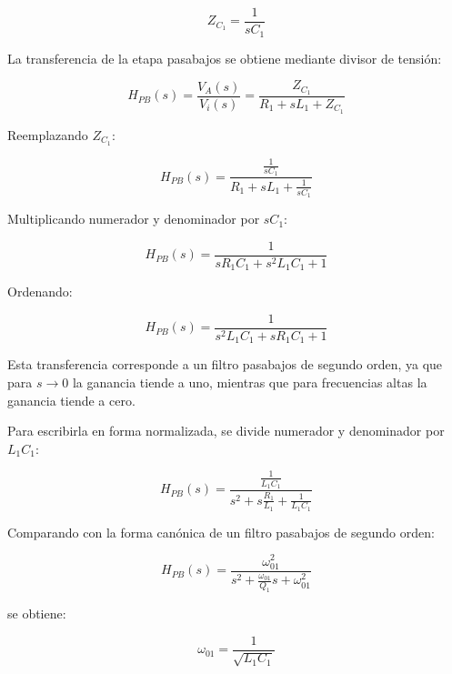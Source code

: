 \documentclass[12pt,a4paper]{article}
\begin{document}
\begin{equation}
    Z_{C_1}=\frac{1}{sC_1}
    \label{eq:zc1}
\end{equation}

La transferencia de la etapa pasabajos se obtiene mediante divisor de tensión:

\begin{equation}
    H_{PB}(s)=\frac{V_A(s)}{V_i(s)}
    =
    \frac{Z_{C_1}}{R_1+sL_1+Z_{C_1}}
    \label{eq:divisor_pb}
\end{equation}

Reemplazando $Z_{C_1}$:

\begin{equation}
    H_{PB}(s)=
    \frac{\frac{1}{sC_1}}
    {R_1+sL_1+\frac{1}{sC_1}}
    \label{eq:hpb_intermedia}
\end{equation}

Multiplicando numerador y denominador por $sC_1$:

\begin{equation}
    H_{PB}(s)=
    \frac{1}
    {sR_1C_1+s^2L_1C_1+1}
    \label{eq:hpb}
\end{equation}

Ordenando:

\begin{equation}
    \boxed{
    H_{PB}(s)=
    \frac{1}
    {s^2L_1C_1+sR_1C_1+1}
    }
    \label{eq:hpb_final}
\end{equation}

Esta transferencia corresponde a un filtro pasabajos de segundo orden, ya que para $s\to 0$ la ganancia tiende a uno, mientras que para frecuencias altas la ganancia tiende a cero.

Para escribirla en forma normalizada, se divide numerador y denominador por $L_1C_1$:

\begin{equation}
    H_{PB}(s)=
    \frac{\frac{1}{L_1C_1}}
    {s^2+s\frac{R_1}{L_1}+\frac{1}{L_1C_1}}
    \label{eq:hpb_normalizada}
\end{equation}

Comparando con la forma canónica de un filtro pasabajos de segundo orden:

\begin{equation}
    H_{PB}(s)=
    \frac{\omega_{01}^2}
    {s^2+\frac{\omega_{01}}{Q_1}s+\omega_{01}^2}
    \label{eq:hpb_canonica}
\end{equation}

se obtiene:

\begin{equation}
    \boxed{
    \omega_{01}=\frac{1}{\sqrt{L_1C_1}}
    }
    \label{eq:w01}
\end{equation}
\end{document}
